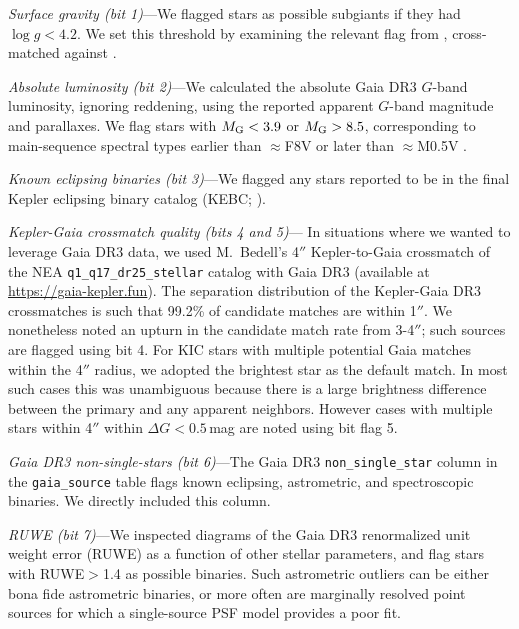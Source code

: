 \documentclass[11pt,twocolumn,tighten]{aastex63}
\begin{document}
{\it Surface gravity (bit 1)}---We flagged stars as possible subgiants
if they had $\log g < 4.2$.  We set this threshold by examining the
relevant flag from \citet{berger_2018_radii_evolnstates},
cross-matched against \citet{Berger_2020a_catalog}.

{\it Absolute luminosity (bit 2)}---We calculated the absolute Gaia
DR3 $G$-band luminosity, ignoring reddening, using the reported
apparent $G$-band magnitude and parallaxes.  We flag stars with
$M_{\rm G} < 3.9$ or $M_{\rm G} > 8.5$, corresponding to main-sequence
spectral types earlier than $\approx$F8V or later than $\approx$M0.5V
\citep{Pecaut_2013}.

{\it Known eclipsing binaries (bit 3)}---We flagged any stars reported
to be in the final Kepler eclipsing binary catalog (KEBC;
\citealt{2016AJ....151...68K}).

{\it Kepler-Gaia crossmatch quality (bits 4 and 5)}--- In situations
where we wanted to leverage Gaia DR3 data, we used M.~Bedell's 4$''$
Kepler-to-Gaia crossmatch %
of the NEA \texttt{q1\_q17\_dr25\_stellar} catalog with Gaia DR3
(available at \url{https://gaia-kepler.fun}).  The
separation distribution of the Kepler-Gaia DR3 crossmatches is such
that 99.2\% of candidate matches are within 1$''$.   We nonetheless
noted an upturn in the candidate match rate from 3-4$''$; such sources
are flagged using bit 4.  For KIC stars with multiple potential Gaia
matches within the 4$''$ radius, we adopted the brightest star as the
default match.  In most such cases this was unambiguous because there
is a large brightness difference between the primary and any apparent
neighbors.  However cases with multiple stars within 4$''$ within
$\Delta G$$<$$0.5$\,mag are noted using bit flag 5.  

{\it Gaia DR3 non-single-stars (bit 6)}---The Gaia DR3
\texttt{non\_single\_star} column in the \texttt{gaia\_source} table
flags known eclipsing, astrometric, and spectroscopic binaries.  We
directly included this column.

{\it RUWE (bit 7)}---We inspected diagrams of the Gaia DR3
renormalized unit weight error (RUWE) as a function of other stellar
parameters, and flag stars with RUWE$>$1.4 as possible binaries.  Such
astrometric outliers can be either bona fide astrometric binaries, or
more often are marginally resolved point sources for which a
single-source PSF model provides a poor fit.
\end{document}
